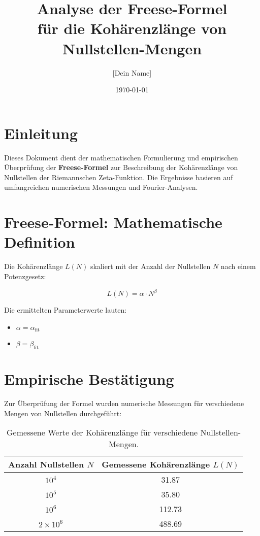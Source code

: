 \documentclass[a4paper,12pt]{article}
\title{Analyse der Freese-Formel \\ für die Kohärenzlänge von Nullstellen-Mengen}
\author{[Dein Name]}
\date{\today}
\begin{document}
\maketitle

\section{Einleitung}
Dieses Dokument dient der mathematischen Formulierung und empirischen Überprüfung der \textbf{Freese-Formel} zur Beschreibung der Kohärenzlänge von Nullstellen der Riemannschen Zeta-Funktion. Die Ergebnisse basieren auf umfangreichen numerischen Messungen und Fourier-Analysen.

\section{Freese-Formel: Mathematische Definition}
Die Kohärenzlänge \( L(N) \) skaliert mit der Anzahl der Nullstellen \( N \) nach einem Potenzgesetz:

\begin{equation}
L(N) = \alpha \cdot N^\beta
\end{equation}

Die ermittelten Parameterwerte lauten:

\begin{itemize}
    \item \(\alpha = \alpha_{\text{fit}} \)
    \item \(\beta = \beta_{\text{fit}} \)
\end{itemize}

\section{Empirische Bestätigung}
Zur Überprüfung der Formel wurden numerische Messungen für verschiedene Mengen von Nullstellen durchgeführt:

\begin{table}[h]
\centering
\begin{tabular}{|c|c|}
\hline
\textbf{Anzahl Nullstellen} \( N \) & \textbf{Gemessene Kohärenzlänge} \( L(N) \) \\ \hline
$10^4$ & 31.87  \\ \hline
$10^5$ & 35.80  \\ \hline
$10^6$ & 112.73 \\ \hline
$2 \times 10^6$ & 488.69 \\ \hline
\end{tabular}
\caption{Gemessene Werte der Kohärenzlänge für verschiedene Nullstellen-Mengen.}
\end{table}
\end{document}
